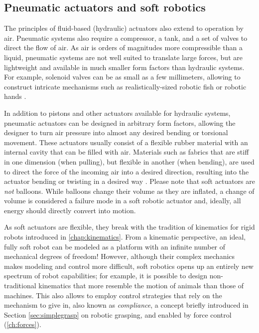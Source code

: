 \subsection{Pneumatic actuators and soft robotics}

The principles of fluid-based (hydraulic) actuators also extend to operation by air. Pneumatic systems also require a compressor, a tank, and a set of valves to direct the flow of air. As air is orders of magnitudes more compressible than a liquid, pneumatic systems are not well suited to translate large forces, but are lightweight and available in much smaller form factors than hydraulic systems. For example, solenoid valves can be as small as a few millimeters, allowing to construct intricate mechanisms such as realistically-sized robotic fish \cite{katzschmann2018exploration} or robotic hands \cite{deimel2016novel}.

In addition to pistons and other actuators available for hydraulic systems, pneumatic actuators can be designed in arbitrary form factors, allowing the designer to turn air pressure into almost any desired bending or torsional movement. These actuators usually consist of a flexible rubber material with an internal cavity that can be filled with air. Materials such as fabrics that are stiff in one dimension (when pulling), but flexible in another (when bending), are used to direct the force of the incoming air into a desired direction, resulting into the actuator bending or twisting in a desired way \cite{polygerinos2017soft}. Please note that soft actuators are \textsl{not} balloons. While balloons change their volume as they are inflated, a change of volume is considered a failure mode in a soft robotic actuator and, ideally, all energy should directly convert into motion.

As soft actuators are flexible, they break with the tradition of kinematics for rigid robots introduced in \cref{chap:kinematics}. From a kinematic perspective, an ideal, fully soft robot can be modeled as a platform with an infinite number of mechanical degrees of freedom!
However, although their complex mechanics makes modeling and control more difficult, soft robotics opens up an entirely new spectrum of robot capabilities; for example, it is possible to design non-traditional kinematics that more resemble the motion of animals than those of machines. This also allows to employ control strategies that rely on the mechanism to give in, also known as \textsl{compliance}, a concept briefly introduced in Section \ref{sec:simplegrasp} on robotic grasping, and enabled by force control (\cref{ch:forces}).


